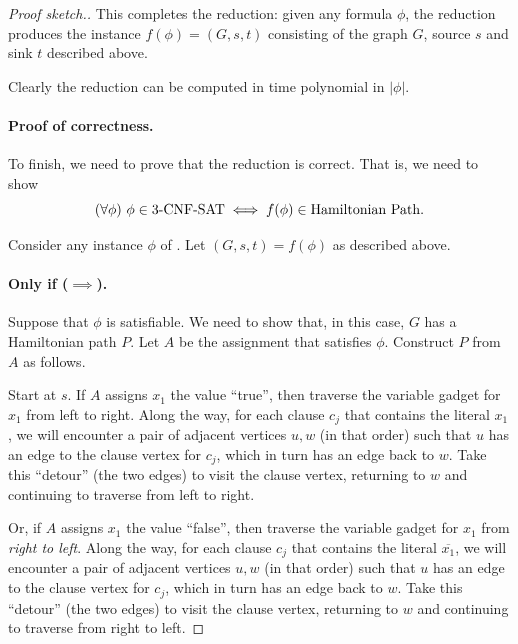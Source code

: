 \documentclass[11pt]{article}
\begin{document}
\begin{proof}[Proof sketch.]
  This completes the reduction:
  given any  formula $\phi$,
  the reduction produces the  instance $f(\phi) = (G,s,t)$
  consisting of the graph $G$, source $s$ and sink $t$ described above.

  Clearly the reduction can be computed in time polynomial in $|\phi|$.

  \paragraph{Proof of correctness.}
  To finish, we need to prove that the reduction is correct.
  That is, we need to show
  \[(\forall \phi)~ \phi\in\prob{3-CNF-SAT} \iff f(\phi) \in \prob{Hamiltonian Path}.\]

  Consider any instance $\phi$ of .
  Let $(G, s, t) = f(\phi)$ as described above.
  
  \paragraph{Only if ($\implies$).}
  Suppose that $\phi$ is satisfiable.  
  We need to show that, in this case, $G$ has a Hamiltonian path $P$.
  Let $A$ be the assignment that satisfies $\phi$.
  Construct $P$ from $A$ as follows.

  Start at $s$.
  If $A$ assigns $x_1$ the value ``true'',
  then traverse the variable gadget for $x_1$ from left to right.
  Along the way, for each clause $c_j$ that contains the literal $x_1$,
  we will encounter a pair of adjacent vertices $u, w$ (in that order)
  such that $u$ has an edge to the clause vertex for $c_j$,
  which in turn has an edge back to $w$.  Take this ``detour''
  (the two edges) to visit the clause vertex, returning to $w$
  and continuing to traverse from left to right.

  Or, if $A$ assigns $x_1$ the value ``false'',
  then traverse the variable gadget for $x_1$ from \emph{right to left}.
  Along the way, for each clause $c_j$ that contains the literal $\overline{x_1}$,
  we will encounter a pair of adjacent vertices $u, w$ (in that order)
  such that $u$ has an edge to the clause vertex for $c_j$,
  which in turn has an edge back to $w$.  Take this ``detour''
  (the two edges) to visit the clause vertex, returning to $w$
  and continuing to traverse from right to left.
  

\end{proof}
\end{document}
